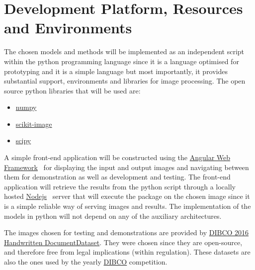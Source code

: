 \documentclass[a4paper, 12pt]{report}
\begin{document}
\section{Development Platform, Resources and Environments}
The chosen models and methods will be implemented as an independent script
within the python programming language since it is a language optimised for
prototyping and it is a simple language but most importantly, it provides
substantial support, environments and libraries for image processing. The open
source python libraries that will be used are:
\begin{itemize}
    \item \href{https://numpy.org/}{numpy}~\cite{numpy}
    \item \href{https://scikit-image.org/}{scikit-image}~\cite{scikit-image}
    \item \href{https://scikit-image.org/}{scipy}~\cite{2020SciPy-NMeth}
\end{itemize}

A simple front-end application will be constructed using the
\href{https://angular.io/}{Angular Web Framework}~\cite{angular_2022} for
displaying the input and output images and navigating between them for
demonstration as well as development and testing. The front-end application
will retrieve the results from the python script through a locally hosted
\href{https://nodejs.org/en/}{Nodejs}~\cite{nodejs_2022} server that will
execute the package on the chosen image since it is a simple reliable way of
serving images and results. The implementation of the models in python will not
depend on any of the auxiliary architectures. \par

The images chosen for testing and demonstrations are provided by
\href{https://vc.ee.duth.gr/h-dibco2016/}{DIBCO 2016 Handwritten
    DocumentDataset}. They were chosen since they are open-source, and therefore
free from legal implications (within regulation). These datasets are also the
ones used by the yearly
\href{https://dib.cin.ufpe.br/#!/resources/dibco}{DIBCO} competition.
\end{document}
